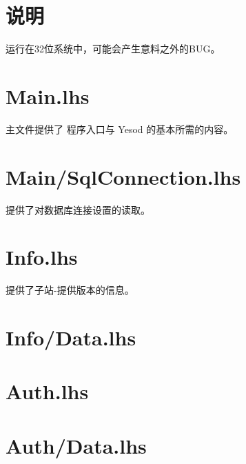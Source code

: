 










  \maketitle
  \newpage
  \tableofcontents
  \newpage

  \section{说明}
  运行在32位系统中，可能会产生意料之外的BUG。

  \section[程序主文件 Main.lhs文件]{Main.lhs}
  主文件提供了 程序入口与 Yesod 的基本所需的内容。
  

  \section[设置载入文件 Main/SqlConnection.lhs文件]{Main/SqlConnection.lhs}
  提供了对数据库连接设置的读取。
  

  \section[子站-提供版本信息 Info.lhs文件]{Info.lhs}
  提供了子站-提供版本的信息。
  

  \section[辅助Info.lhs文件]{Info/Data.lhs}
  
  
  \section[认证]{Auth.lhs}
  
  
  \section[辅助Auth.lhs]{Auth/Data.lhs}
  


  


